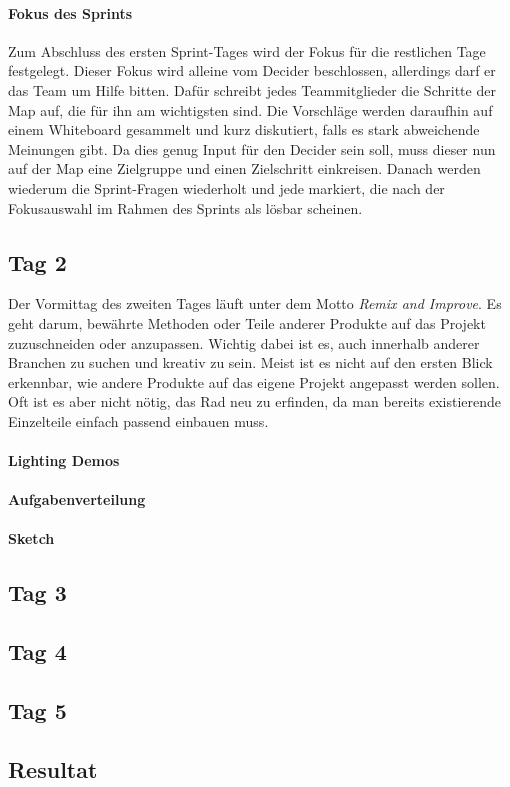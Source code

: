 \paragraph{Fokus des Sprints}
Zum Abschluss des ersten Sprint-Tages wird der Fokus für die restlichen Tage festgelegt. Dieser Fokus wird alleine vom Decider beschlossen, allerdings darf er das Team um Hilfe bitten. Dafür schreibt jedes Teammitglieder die Schritte der Map auf, die für ihn am wichtigsten sind. Die Vorschläge werden daraufhin auf einem Whiteboard gesammelt und kurz diskutiert, falls es stark abweichende Meinungen gibt. Da dies genug Input für den Decider sein soll, muss dieser nun auf der Map eine Zielgruppe und einen Zielschritt einkreisen. Danach werden wiederum die Sprint-Fragen wiederholt und jede markiert, die nach der Fokusauswahl im Rahmen des Sprints als lösbar scheinen.

\subsection*{Tag 2}
Der Vormittag des zweiten Tages läuft unter dem Motto \textit{Remix and Improve}. Es geht darum, bewährte Methoden oder Teile anderer Produkte auf das Projekt zuzuschneiden oder anzupassen. Wichtig dabei ist es, auch innerhalb anderer Branchen zu suchen und kreativ zu sein. Meist ist es nicht auf den ersten Blick erkennbar, wie andere Produkte auf das eigene Projekt angepasst werden sollen. Oft ist es aber nicht nötig, das Rad neu zu erfinden, da man bereits existierende Einzelteile einfach passend einbauen muss.
\paragraph{Lighting Demos}

\paragraph{Aufgabenverteilung}

\paragraph{Sketch}

\subsection*{Tag 3}

\subsection*{Tag 4}

\subsection*{Tag 5}

\subsection*{Resultat}
